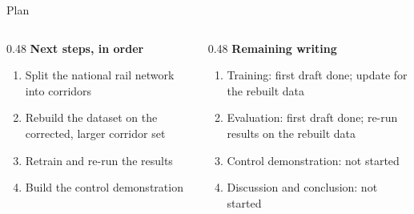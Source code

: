 \documentclass[aspectratio=169,11pt]{beamer}
\begin{document}
\begin{frame}{Plan}
  \vspace{0.4em}
  \begin{columns}[T,onlytextwidth]
    \begin{column}{0.48\textwidth}
      {\small\textbf{Next steps, in order}}
      \begin{enumerate}\setlength\itemsep{0.35em}
        \footnotesize
        \item Split the national rail network into corridors
        \item Rebuild the dataset on the corrected, larger corridor set
        \item Retrain and re-run the results
        \item Build the control demonstration
      \end{enumerate}
    \end{column}
    \begin{column}{0.48\textwidth}
      {\small\textbf{Remaining writing}}
      \begin{enumerate}\setlength\itemsep{0.35em}
        \footnotesize
        \setcounter{enumi}{8}
        \item Training: first draft done; update for the rebuilt data
        \item Evaluation: first draft done; re-run results on the rebuilt data
        \item Control demonstration: not started
        \item Discussion and conclusion: not started
      \end{enumerate}
    \end{column}
  \end{columns}
\end{frame}
\end{document}
